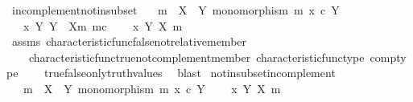 \begin{isabellebody}
\isanewline
{}\isamarkupfalse%
\ in{\isacharunderscore}{\kern0pt}complement{\isacharunderscore}{\kern0pt}not{\isacharunderscore}{\kern0pt}in{\isacharunderscore}{\kern0pt}subset{\isacharcolon}{\kern0pt}\isanewline
\ \ \ {\isachardoublequoteopen}m\ {\isacharcolon}{\kern0pt}\ X\ {\isasymrightarrow}\ Y{\isachardoublequoteclose}\ {\isachardoublequoteopen}monomorphism\ m{\isachardoublequoteclose}\ {\isachardoublequoteopen}x\ {\isasymin}\isactrlsub c\ Y{\isachardoublequoteclose}\isanewline
\ \ \ {\isachardoublequoteopen}x\ {\isasymin}\isactrlbsub Y\isactrlesub \ {\isacharparenleft}{\kern0pt}Y\ {\isasymsetminus}\ {\isacharparenleft}{\kern0pt}X{\isacharcomma}{\kern0pt}m{\isacharparenright}{\kern0pt}{\isacharcomma}{\kern0pt}\ m\isactrlsup c{\isacharparenright}{\kern0pt}{\isachardoublequoteclose}\isanewline
\ \ \ {\isachardoublequoteopen}{\isasymnot}\ x\ {\isasymin}\isactrlbsub Y\isactrlesub \ {\isacharparenleft}{\kern0pt}X{\isacharcomma}{\kern0pt}\ m{\isacharparenright}{\kern0pt}{\isachardoublequoteclose}\isanewline
%
\isadelimproof
\ \ %
\endisadelimproof
%
\isatagproof
{}\isamarkupfalse%
\ assms\ characteristic{\isacharunderscore}{\kern0pt}func{\isacharunderscore}{\kern0pt}false{\isacharunderscore}{\kern0pt}not{\isacharunderscore}{\kern0pt}relative{\isacharunderscore}{\kern0pt}member\isanewline
\ \ \ \ characteristic{\isacharunderscore}{\kern0pt}func{\isacharunderscore}{\kern0pt}true{\isacharunderscore}{\kern0pt}not{\isacharunderscore}{\kern0pt}complement{\isacharunderscore}{\kern0pt}member\ characteristic{\isacharunderscore}{\kern0pt}func{\isacharunderscore}{\kern0pt}type\ comp{\isacharunderscore}{\kern0pt}type\isanewline
\ \ \ \ true{\isacharunderscore}{\kern0pt}false{\isacharunderscore}{\kern0pt}only{\isacharunderscore}{\kern0pt}truth{\isacharunderscore}{\kern0pt}values\ \isamarkupfalse%
\ blast%
\endisatagproof
{\isafoldproof}%
%
\isadelimproof
\isanewline
%
\endisadelimproof
\isanewline
{}\isamarkupfalse%
\ not{\isacharunderscore}{\kern0pt}in{\isacharunderscore}{\kern0pt}subset{\isacharunderscore}{\kern0pt}in{\isacharunderscore}{\kern0pt}complement{\isacharcolon}{\kern0pt}\isanewline
\ \ \ {\isachardoublequoteopen}m\ {\isacharcolon}{\kern0pt}\ X\ {\isasymrightarrow}\ Y{\isachardoublequoteclose}\ {\isachardoublequoteopen}monomorphism\ m{\isachardoublequoteclose}\ {\isachardoublequoteopen}x\ {\isasymin}\isactrlsub c\ Y{\isachardoublequoteclose}\isanewline
\ \ \ {\isachardoublequoteopen}{\isasymnot}\ x\ {\isasymin}\isactrlbsub Y\isactrlesub \ {\isacharparenleft}{\kern0pt}X{\isacharcomma}{\kern0pt}\ m{\isacharparenright}{\kern0pt}{\isachardoublequoteclose}\isanewline

\end{isabellebody}
